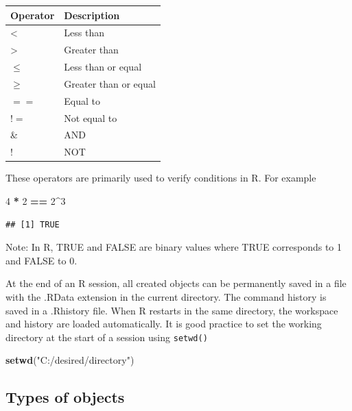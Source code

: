 \documentclass[
]{article}
\newenvironment{Shaded}{\begin{snugshade}}{\end{snugshade}}
\newcommand{\DecValTok}[1]{\textcolor[rgb]{0.00,0.00,0.81}{#1}}
\newcommand{\FunctionTok}[1]{\textcolor[rgb]{0.13,0.29,0.53}{\textbf{#1}}}
\newcommand{\NormalTok}[1]{#1}
\newcommand{\SpecialCharTok}[1]{\textcolor[rgb]{0.81,0.36,0.00}{\textbf{#1}}}
\newcommand{\StringTok}[1]{\textcolor[rgb]{0.31,0.60,0.02}{#1}}
\begin{document}
\begin{longtable}[]{@{}ll@{}}
\toprule\noalign{}
Operator & Description \\
\midrule\noalign{}
\endhead
\bottomrule\noalign{}
\endlastfoot
\textless{} & Less than \\
\textgreater{} & Greater than \\
\(\le\) & Less than or equal \\
\(\ge\) & Greater than or equal \\
\(==\) & Equal to \\
\(!=\) & Not equal to \\
\& & AND \\
! & NOT \\
\end{longtable}

These operators are primarily used to verify conditions in R. For
example

\begin{Shaded}
\begin{Highlighting}[]
\DecValTok{4} \SpecialCharTok{*} \DecValTok{2} \SpecialCharTok{==} \DecValTok{2}\SpecialCharTok{\^{}}\DecValTok{3}
\end{Highlighting}
\end{Shaded}

\begin{verbatim}
## [1] TRUE
\end{verbatim}

Note: In R, TRUE and FALSE are binary values where TRUE corresponds to 1
and FALSE to 0.

At the end of an R session, all created objects can be permanently saved
in a file with the .RData extension in the current directory. The
command history is saved in a .Rhistory file. When R restarts in the
same directory, the workspace and history are loaded automatically. It
is good practice to set the working directory at the start of a session
using \texttt{setwd()}

\begin{Shaded}
\begin{Highlighting}[]
\FunctionTok{setwd}\NormalTok{(}\StringTok{"C:/desired/directory"}\NormalTok{)}
\end{Highlighting}
\end{Shaded}

\hypertarget{types-of-objects}{%
\subsection{Types of objects}\label{types-of-objects}}
\end{document}
